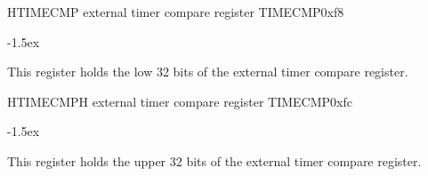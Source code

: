 \documentclass[12pt]{article}
\begin{document}
\begin{register}{H}{TIMECMP external timer compare register TIMECMP}{0xf8}
\label{timecmp}
%
\regnewline%
\end{register}
\begin{regdesc}[0.8\textwidth]\begin{reglist}[0000]
\itemsep-1.5ex
\item This register holds the low 32 bits of the external timer compare register.
\end{reglist}\end{regdesc}

\begin{register}{H}{TIMECMPH external timer compare register TIMECMP}{0xfc}
\label{timecmph}
%
\regnewline%
\end{register}
\begin{regdesc}[0.8\textwidth]\begin{reglist}[0000]
\itemsep-1.5ex
\item This register holds the upper 32 bits of the external timer compare register.
\end{reglist}\end{regdesc}
\end{document}
